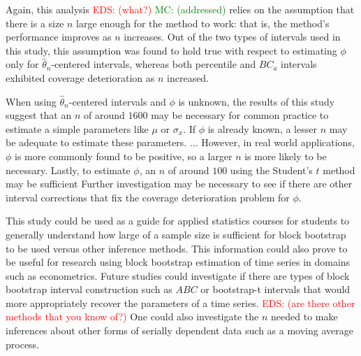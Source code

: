 \documentclass[12pt, letterpaper, titlepage]{article}
\newcommand{\eds}[1]{\textcolor{red}{EDS: (#1)}}
\newcommand{\mc}[1]{\textcolor{green}{MC: (#1)}}
\begin{document}
Again, this analysis \eds{what?} \mc{addressed} relies on the assumption that
there is a size $n$ large enough for the method to work: that is, the method's
performance improves as $n$ increases. Out of the two types of intervals used
in this study, this assumption was found to hold true with respect to
estimating $\phi$ only for $\hat{\theta}_{n}$-centered intervals, whereas both
percentile and $BC_a$ intervals exhibited coverage deterioration as $n$
increased.


When using $\hat{\theta}_{n}$-centered intervals and $\phi$ is
unknown, the results of this study suggest that an $n$ of around $1600$ may be
necessary for common practice to estimate a simple parameters like $\mu$ 
or $\sigma_x$. If $\phi$ is already known, a lesser $n$ may be adequate
to
estimate these parameters. ... However, in real world applications, $\phi$ is
more commonly found to be positive, so a larger $n$ is more likely to be
necessary. Lastly, to estimate $\phi$, an $n$ of around $100$ using the Student's $t$ method
 may be sufficient
Further investigation may be necessary to see if there are other interval
corrections that fix the coverage deterioration problem for $\phi$.


This study could be used as a guide for applied statistics courses for students
to generally understand how large of a sample size is sufficient for block
bootstrap to be used versus other inference methods.
This information could also prove to be useful for research using block
bootstrap
estimation of time series in domains such as econometrics. Future studies
could investigate if there are types of block bootstrap interval
construction such as $ABC$ or bootstrap-t intervals
that would more appropriately recover the parameters of a time
series. \eds{are there other methods that you know of?} 
One could also investigate the $n$ needed to make inferences about
other forms of serially dependent data such as a moving average process.




\end{document}
